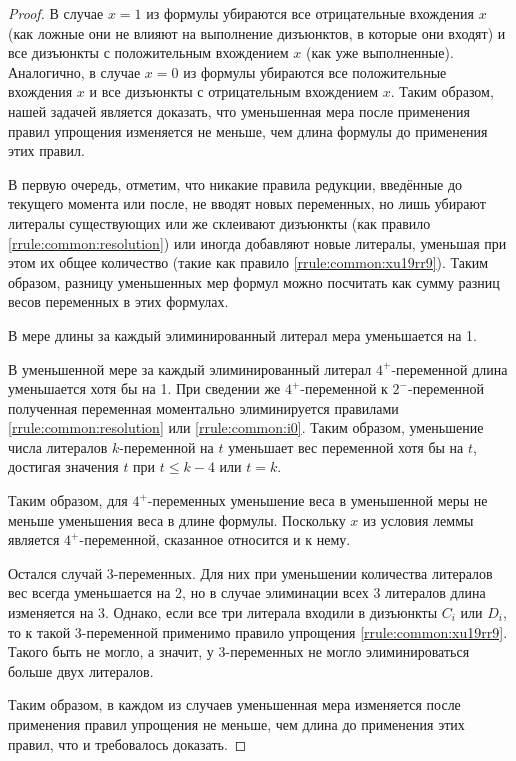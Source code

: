 \begin{proof}
 В случае $x = 1$ из формулы убираются все отрицательные вхождения $x$ (как ложные они не влияют на выполнение дизъюнктов, в которые они входят) и все дизъюнкты с положительным вхождением $x$ (как уже выполненные). Аналогично, в случае $x = 0$ из формулы убираются все положительные вхождения $x$ и все дизъюнкты с отрицательным вхождением $x$. Таким образом, нашей задачей является доказать, что уменьшенная мера после применения правил упрощения изменяется не меньше, чем длина формулы до применения этих правил.

 В первую очередь, отметим, что никакие правила редукции, введённые до текущего момента или после, не вводят новых переменных, но лишь убирают литералы существующих или же склеивают дизъюнкты (как правило \ref{rrule:common:resolution}) или иногда добавляют новые литералы, уменьшая при этом их общее количество (такие как правило \ref{rrule:common:xu19rr9}). Таким образом, разницу уменьшенных мер формул можно посчитать как сумму разниц весов переменных в этих формулах.

 В мере длины за каждый элиминированный литерал мера уменьшается на 1.

 В уменьшенной мере за каждый элиминированный литерал $4^+$-переменной длина уменьшается хотя бы на 1. При сведении же $4^+$-переменной к $2^-$-переменной полученная переменная моментально элиминируется правилами \ref{rrule:common:resolution} или \ref{rrule:common:i0}. Таким образом, уменьшение числа литералов $k$-переменной на $t$ уменьшает вес переменной хотя бы на $t$, достигая значения $t$ при $t \leq k - 4$ или $t = k$.

 Таким образом, для $4^+$-переменных уменьшение веса в уменьшенной меры не меньше уменьшения веса в длине формулы. Поскольку $x$ из условия леммы является $4^+$-переменной, сказанное относится и к нему.

 Остался случай 3-переменных. Для них при уменьшении количества литералов вес всегда уменьшается на 2, но в случае элиминации всех 3 литералов длина изменяется на 3. Однако, если все три литерала входили в дизъюнкты $C_i$ или $D_i$, то к такой 3-переменной применимо правило упрощения \ref{rrule:common:xu19rr9}. Такого быть не могло, а значит, у 3-переменных не могло элиминироваться больше двух литералов.

 Таким образом, в каждом из случаев уменьшенная мера изменяется после применения правил упрощения не меньше, чем длина до применения этих правил, что и требовалось доказать.
\end{proof}

